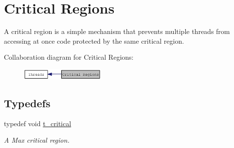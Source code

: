 \hypertarget{group__critical}{
\section{Critical Regions}
\label{group__critical}
}


A critical region is a simple mechanism that prevents multiple threads from accessing at once code protected by the same critical region.  


Collaboration diagram for Critical Regions:\nopagebreak
\begin{figure}[H]
\begin{center}
\leavevmode
\includegraphics[width=120pt]{group__critical}
\end{center}
\end{figure}
\subsection*{Typedefs}
\begin{DoxyCompactItemize}
\item 
\hypertarget{group__critical_gaa00494020fc3fa3005b63a294cab3886}{
typedef void \hyperlink{group__critical_gaa00494020fc3fa3005b63a294cab3886}{t\_\-critical}}
\label{group__critical_gaa00494020fc3fa3005b63a294cab3886}

\begin{DoxyCompactList}\small\item\em A Max critical region. \item\end{DoxyCompactList}\end{DoxyCompactItemize}
